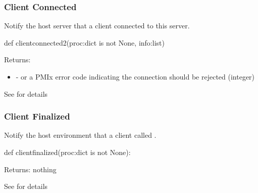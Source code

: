 \subsubsection{Client Connected}

\summary

Notify the host server that a client connected to this server.

\format

\pyspecificstart
\begin{codepar}
def clientconnected2(proc:dict is not None, info:list)
\end{codepar}
\pyspecificend

\begin{arglist}
\end{arglist}

Returns:
\begin{itemize}
    \item {} -  or a \ac{PMIx} error code indicating the connection should be rejected (integer)
\end{itemize}

See  for details


\subsubsection{Client Finalized}

\summary

Notify the host environment that a client called .

\format

\pyspecificstart
\begin{codepar}
def clientfinalized(proc:dict is not None):
\end{codepar}
\pyspecificend

\begin{arglist}
\end{arglist}

Returns: nothing

See  for details


